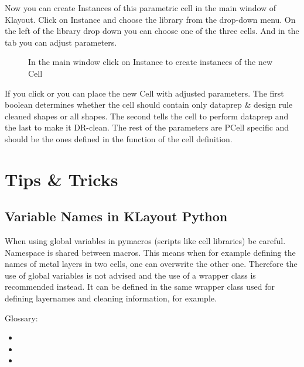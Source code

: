 \documentclass[a4paper,10pt,english]{sphinxmanual}
\begin{document}
Now you can create Instances of this parametric cell in the main window of Klayout. Click on Instance and
choose the  library from the drop-down menu. On the left of the library
drop down you can choose one of the three cells. And in the tab you can adjust parameters.

\begin{figure}[htbp]
\centering
\capstart

\noindent{}
\caption{In the main window click on Instance to create instances of the new Cell}\label{\detokenize{example_library:id4}}\end{figure}

If you click  or  you can place the new Cell with adjusted parameters. The first boolean determines
whether the cell should contain only dataprep \& design rule cleaned shapes or all shapes. The second tells the
cell to perform dataprep and the last to make it DR-clean. The rest of the parameters are PCell specific and should
be the ones defined in the  function of the cell definition.


\chapter{Tips \& Tricks}
\label{\detokenize{tips:tips-tricks}}\label{\detokenize{tips::doc}}

\section{Variable Names in KLayout Python}
\label{\detokenize{tips:variable-names-in-klayout-python}}
When using global variables in pymacros (scripts like cell libraries) be careful. Namespace is shared between macros. This means when for example defining the names of metal layers in two cells, one can overwrite the other one.
Therefore the use of global variables is not advised and the use of a wrapper class is recommended instead. It can be defined in the same wrapper class used for defining layernames and cleaning information, for example.

Glossary:
\begin{itemize}
\item {} 

\item {} 

\item {} 

\end{itemize}
\end{document}
